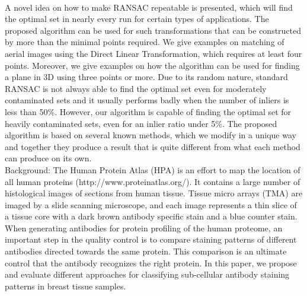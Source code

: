 {{\begin{enumerate}
 
\\ \aabstract
A novel idea on how to make RANSAC repeatable is presented, which will find the optimal set in nearly every run for certain types of applications. The proposed algorithm can be used for such transformations that can be constructed by more than the minimal points required. We give examples on matching of aerial images using the Direct Linear Transformation, which requires at least four points. Moreover, we give examples on how the algorithm can be used for finding a plane in 3D using three points or more. Due to its random nature, standard RANSAC is not always able to find the optimal set even for moderately contaminated sets and it usually performs badly when the number of inliers is less than 50\%. However, our algorithm is capable of finding the optimal set for heavily contaminated sets, even for an inlier ratio under 5\%. The proposed algorithm is based on several known methods, which we modify in a unique way and together they produce a result that is quite different from what each method can produce on its own.
{}
\\ \aabstract
Background: The Human Protein Atlas (HPA) is an effort to map the location of all human proteins (http://www.proteinatlas.org/). It contains a large number of histological images of sections from human tissue. Tissue micro arrays (TMA) are imaged by a slide scanning microscope, and each image represents a thin slice of a tissue core with a dark brown antibody specific stain and a blue counter stain. When generating antibodies for protein profiling of the human proteome, an important step in the quality control is to compare staining patterns of different antibodies directed towards the same protein. This comparison is an ultimate control that the antibody recognizes the right protein. In this paper, we propose and evaluate different approaches for classifying sub-cellular antibody staining patterns in breast tissue samples. \\

\end{enumerate}}}

